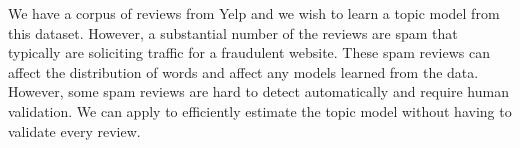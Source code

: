 \begin{example}\sloppy
We have a corpus of reviews from Yelp and we wish to learn a topic model from this dataset.
However, a substantial number of the reviews are spam that typically are soliciting traffic for a fraudulent website.
These spam reviews can affect the distribution of words and affect any models learned from the data.
However, some spam reviews are hard to detect automatically and require human validation.
We can apply \sys to efficiently estimate the topic model without having to validate every review.
\end{example}
 









